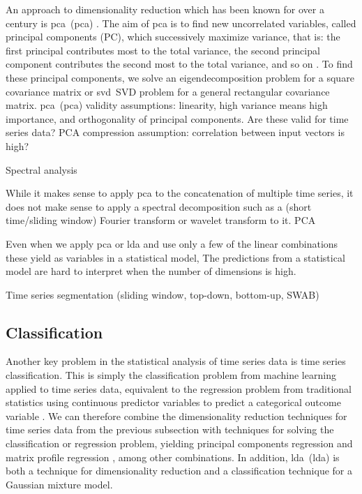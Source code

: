 An approach to dimensionality reduction which has been known for over a century is \acrlong{pca}~(\acrshort{pca}) \citep{doi:10.1080/14786440109462720,hotelling1933analysis}.
The aim of \acrshort{pca} is to find new uncorrelated variables, called principal components (PC), which successively maximize variance, that is: the first principal contributes most to the total variance, the second principal component contributes the second most to the total variance, and so on \citep{doi:10.1098/rsta.2015.0202}.
To find these principal components, we solve an eigendecomposition problem for a square covariance matrix or \acrlong{svd}~\acrshort{SVD} problem for a general rectangular covariance matrix.
\Acrlong{pca}~(\acrshort{pca}) validity assumptions: linearity, high variance means high importance, and orthogonality of principal components. Are these valid for time series data?
PCA compression assumption: correlation between input vectors is high?


Spectral analysis

While it makes sense to apply \acrshort{pca} to the concatenation of multiple time series, it does not make sense to apply a spectral decomposition such as a (short time/sliding window) Fourier transform or wavelet transform to it.
PCA
\citep{DBLP:journals/pvldb/DingTSWK08}

Even when we apply \acrshort{pca} or \acrshort{lda} and use only a few of the linear combinations these yield as variables in a statistical model,
The predictions from a statistical model are hard to interpret when the number of dimensions is high.

Time series segmentation (sliding window, top-down, bottom-up, SWAB) \citep{DBLP:conf/icdm/KeoghCHP01}

\subsection{Classification}

Another key problem in the statistical analysis of time series data is time series classification.
This is simply the classification problem from machine learning \citep{hastie2009elements} applied to time series data, equivalent to the regression problem from traditional statistics using continuous predictor variables to predict a categorical outcome variable \citep{agresti2003categorical}.
We can therefore combine the dimensionality reduction techniques for time series data from the previous subsection with techniques for solving the classification or regression problem, yielding principal components regression \citep{hastie2009elements} and matrix profile regression \citep{DBLP:journals/frai/GuidottiD21,seoni2021template}, among other combinations.
In addition, \acrlong{lda}~(\acrshort{lda}) \citep{hastie2009elements,mardia1979multivariate} is both a technique for dimensionality reduction and a classification technique for a Gaussian mixture model.

